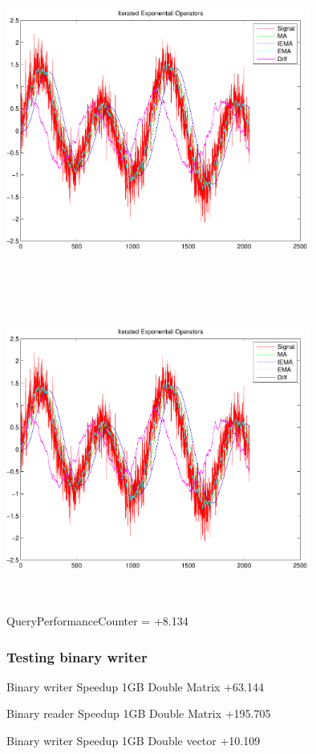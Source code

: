 \documentclass[9pt]{article}
\theoremstyle{plain}
\theoremstyle{definition}
\theoremstyle{remark}
\numberwithin{equation}{section}
\begin{document}
\includegraphics[width=10.0cm,height=10.0cm]{IteratedExponentailOperators.pdf}

\includegraphics[width=10.0cm,height=10.0cm]{IteratedExponentailOperators.pdf}

QueryPerformanceCounter  =  +8.134
\subsubsection{Testing binary writer}
Binary writer Speedup 1GB Double Matrix +63.144

Binary reader Speedup 1GB Double Matrix +195.705

Binary writer Speedup 1GB Double vector +10.109
\end{document}
